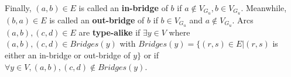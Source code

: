 \begin{defn}
\begin{itemize}
        Finally, \begin{math}(a,b) \in E\end{math} is called an \textbf{in-bridge} of \begin{math}b\end{math} if \begin{math}a \notin V_{G_{u}}, b \in V_{G_{u}}\end{math}. Meanwhile, \begin{math}(b,a) \in E\end{math} is called an \textbf{out-bridge} of \begin{math}b\end{math} if \begin{math}b \in V_{G_{u}}\end{math} and \begin{math}a \notin V_{G_{u}}\end{math}. Arcs \begin{math}(a,b), (c,d) \in E\end{math} are \textbf{type-alike} if \begin{math}\exists y \in V\end{math} where \begin{math}(a,b), (c,d) \in Bridges(y)\end{math} with \begin{math}Bridges(y) = \{(r,s) \in E|(r,s)\end{math} is either an in-bridge or out-bridge of \begin{math}y\}\end{math} or if \begin{math}\forall y \in V, (a,b), (c,d) \notin Bridges(y)\end{math}.
    \end{itemize} 
\end{defn}

